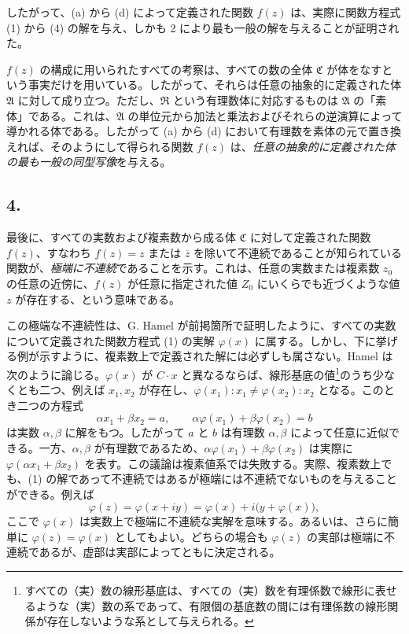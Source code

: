 したがって、(a) から (d) によって定義された関数 $f(z)$ は、実際に関数方程式 (1) から (4) の解を与え、しかも 2 により最も一般の解を与えることが証明された。

$f(z)$ の構成に用いられたすべての考察は、すべての数の全体 $\mathfrak C$ が体をなすという事実だけを用いている。したがって、それらは任意の抽象的に定義された体 $\mathfrak A$ に対して成り立つ。ただし、$\mathfrak R$ という有理数体に対応するものは $\mathfrak A$ の「素体」である。これは、$\mathfrak A$ の単位元から加法と乗法およびそれらの逆演算によって導かれる体である。したがって (a) から (d) において有理数を素体の元で置き換えれば、そのようにして得られる関数 $f(z)$ は、\emph{任意の抽象的に定義された体の最も一般の同型写像}を与える。

\subsection*{4.}

最後に、すべての実数および複素数から成る体 $\mathfrak C$ に対して定義された関数 $f(z)$、すなわち $f(z)=z$ または $\overline z$ を除いて不連続であることが知られている関数が、\emph{極端に不連続}であることを示す。これは、任意の実数または複素数 $z_0$ の任意の近傍に、$f(z)$ が任意に指定された値 $Z_0$ にいくらでも近づくような値 $z$ が存在する、という意味である。

この極端な不連続性は、G. Hamel が前掲箇所で証明したように、すべての実数について定義された関数方程式 (1) の実解 $\varphi(x)$ に属する。しかし、下に挙げる例が示すように、複素数上で定義された解には必ずしも属さない。Hamel は次のように論じる。$\varphi(x)$ が $C\cdot x$ と異なるならば、線形基底の値\footnote{すべての（実）数の線形基底は、すべての（実）数を有理係数で線形に表せるような（実）数の系であって、有限個の基底数の間には有理係数の線形関係が存在しないような系として与えられる。}のうち少なくとも二つ、例えば $x_1,x_2$ が存在し、$\varphi(x_1):x_1\ne\varphi(x_2):x_2$ となる。このとき二つの方程式
\[
\alpha x_1+\beta x_2=a,
\qquad
\alpha\varphi(x_1)+\beta\varphi(x_2)=b
\]
は実数 $\alpha,\beta$ に解をもつ。したがって $a$ と $b$ は有理数 $\alpha,\beta$ によって任意に近似できる。一方、$\alpha,\beta$ が有理数であるため、$\alpha\varphi(x_1)+\beta\varphi(x_2)$ は実際に $\varphi(\alpha x_1+\beta x_2)$ を表す。この議論は複素値系では失敗する。実際、複素数上でも、(1) の解であって不連続ではあるが極端には不連続でないものを与えることができる。例えば
\[
\varphi(z)=\varphi(x+iy)=\varphi(x)+i\bigl(y+\varphi(x)\bigr),
\]
ここで $\varphi(x)$ は実数上で極端に不連続な実解を意味する。あるいは、さらに簡単に $\varphi(z)=\varphi(x)$ としてもよい。どちらの場合も $\varphi(z)$ の実部は極端に不連続であるが、虚部は実部によってともに決定される。

